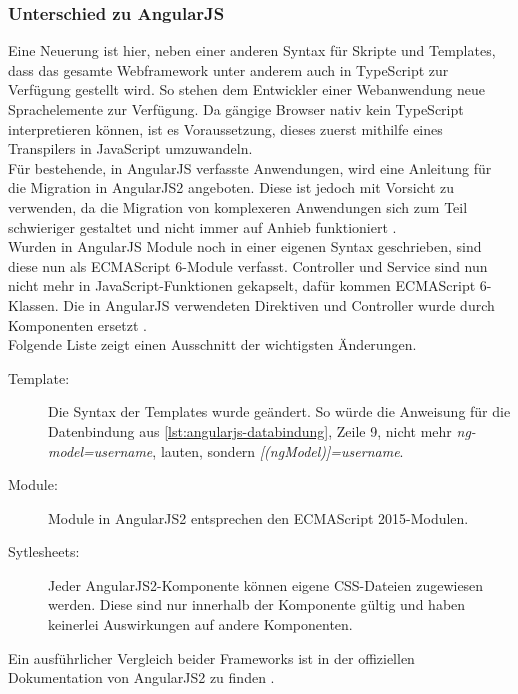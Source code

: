 \subsubsection{Unterschied zu AngularJS}

Eine Neuerung ist hier, neben einer anderen Syntax für Skripte und Templates, dass das gesamte Webframework unter anderem auch in TypeScript zur Verfügung gestellt wird. So stehen dem Entwickler einer Webanwendung neue Sprachelemente zur Verfügung. Da gängige Browser nativ kein TypeScript interpretieren können, ist es Voraussetzung, dieses zuerst mithilfe eines Transpilers in JavaScript umzuwandeln. \\
Für bestehende, in AngularJS verfasste Anwendungen, wird eine Anleitung für die Migration in AngularJS2 angeboten. Diese ist jedoch mit Vorsicht zu verwenden, da die Migration von komplexeren Anwendungen sich zum Teil schwieriger gestaltet und nicht immer auf Anhieb funktioniert \cite{Google2016}. \\
Wurden in AngularJS Module noch in einer eigenen Syntax geschrieben, sind diese nun als ECMAScript 6-Module verfasst. Controller und Service sind nun nicht mehr in JavaScript-Funktionen gekapselt, dafür kommen ECMAScript 6-Klassen. Die in AngularJS verwendeten Direktiven und Controller wurde durch Komponenten ersetzt \cite[S. 16]{Rangle.io2016}. \\
Folgende Liste zeigt einen Ausschnitt der wichtigsten Änderungen.

\begin{description}
	\item[Template:] Die Syntax der Templates wurde geändert. So würde die Anweisung für die Datenbindung aus \autoref{lst:angularjs-databindung}, Zeile 9, nicht mehr \textit{ng-model=\grqq username\grqq}, lauten, sondern \textit{[(ngModel)]=\grqq username\grqq}.
		
	\item[Module:] Module in AngularJS2 entsprechen den ECMAScript 2015-Modulen.
	
	\item[Sytlesheets:] Jeder AngularJS2-Komponente können eigene CSS-Dateien zugewiesen werden. Diese sind nur innerhalb der Komponente gültig und haben keinerlei Auswirkungen auf andere Komponenten.
\end{description}



%	

Ein ausführlicher Vergleich beider Frameworks ist in der offiziellen Dokumentation von AngularJS2 zu finden \cite{Google2016b}.